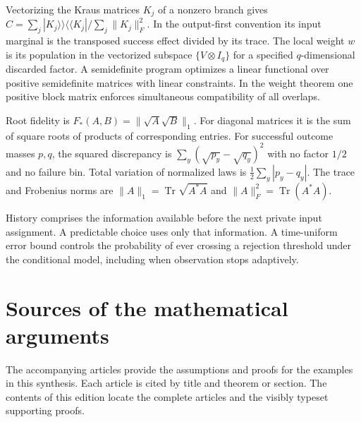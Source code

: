 \documentclass[11pt,letterpaper]{article}
\newcommand{\tr}{\operatorname{Tr}}\newcommand{\TV}{\operatorname{TV}}\newcommand{\E}{\mathbb E}\newcommand{\id}{\mathbb I}\newcommand{\calB}{\mathcal B}\newcommand{\norm}[1]{\left\lVert#1\right\rVert}
\begin{document}
\begin{description}[style=nextline,leftmargin=0pt,labelindent=0pt,itemsep=3pt,parsep=0pt]
\item[Choi state and local weight.] Vectorizing the Kraus matrices $K_j$ of a nonzero branch gives $C=\sum_j|K_j\rangle\!\rangle\langle\!\langle K_j|/\sum_j\|K_j\|_F^2$. In the output-first convention its input marginal is the transposed success effect divided by its trace. The local weight $w$ is its population in the vectorized subspace $\{V\otimes I_q\}$ for a specified $q$-dimensional discarded factor. A semidefinite program optimizes a linear functional over positive semidefinite matrices with linear constraints. In the weight theorem one positive block matrix enforces simultaneous compatibility of all overlaps.
\item[Fidelity, discrepancy and distance.] Root fidelity is $F_*(A,B)=\|\sqrt A\sqrt B\|_1$. For diagonal matrices it is the sum of square roots of products of corresponding entries. For successful outcome masses $p,q$, the squared discrepancy is $\sum_y(\sqrt{p_y}-\sqrt{q_y})^2$ with no factor $1/2$ and no failure bin. Total variation of normalized laws is $\tfrac12\sum_y|p_y-q_y|$. The trace and Frobenius norms are $\|A\|_1=\tr\sqrt{A^*A}$ and $\|A\|_F^2=\tr(A^*A)$.
\item[History and time-uniform inference.] History comprises the information available before the next private input assignment. A predictable choice uses only that information. A time-uniform error bound controls the probability of ever crossing a rejection threshold under the conditional model, including when observation stops adaptively.
\end{description}

\normalsize\clearpage\section*{Sources of the mathematical arguments}
The accompanying articles provide the assumptions and proofs for the examples in this synthesis. Each article is cited by title and theorem or section. The contents of this edition locate the complete articles and the visibly typeset supporting proofs.
\end{document}

